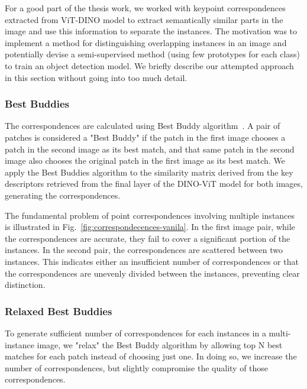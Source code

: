 For a good part of the thesis work, we worked with keypoint correspondences extracted from ViT-DINO model to extract semantically similar parts in the image and use this information to separate the instances. The motivation was to implement a method for distinguishing overlapping instances in an image and potentially devise a semi-supervised method (using few prototypes for each class) to train an object detection model. We briefly describe our attempted approach in this section without going into too much detail.

\subsubsection{Best Buddies}
The correspondences are calculated using Best Buddy algorithm~\cite{Aberman_2018}. A pair of patches is considered a "Best Buddy" if the patch in the first image chooses a patch in the second image as its best match, and that same patch in the second image also chooses the original patch in the first image as its best match. We apply the Best Buddies algorithm to the similarity matrix derived from the key descriptors retrieved from the final layer of the DINO-ViT model for both images, generating the correspondences.

The fundamental problem of point correspondences involving multiple instances is illustrated in Fig.~\ref{fig:correspondecences-vanila}. 
In the first image pair, while the correspondences are accurate, they fail to cover a significant portion of the instances. In the second pair, the correspondences are scattered between two instances. This indicates either an insufficient number of correspondences or that the correspondences are unevenly divided between the instances, preventing clear distinction.

\subsubsection{Relaxed Best Buddies}
To generate sufficient number of correspondences for each instances in a multi-instance image, we "relax" the Best Buddy algorithm by allowing top N best matches for each patch instead of choosing just one. In doing so, we increase the number of correspondences, but slightly compromise the quality of those correspondences.


